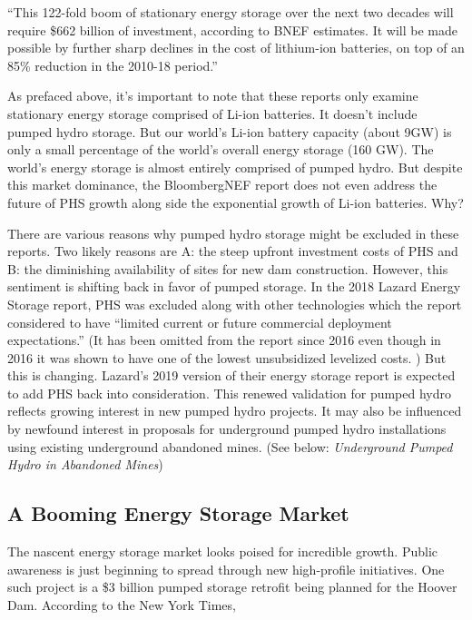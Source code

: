 \documentclass[hidelinks,12pt,a4paper]{article}
\begin{document}
\begin{displayquote}
“This 122-fold boom of stationary energy storage over the next two decades will require \$662 billion of investment, according to BNEF estimates. It will be made possible by further sharp declines in the cost of lithium-ion batteries, on top of an 85\% reduction in the 2010-18 period.” \cite{EnergyStorageInvestmentsBoom}
\end{displayquote}

As prefaced above, it's important to note that these reports only examine stationary energy storage comprised of Li-ion batteries. It doesn't include pumped hydro storage. But our world's Li-ion battery capacity (about 9GW) is only a small percentage of the world's overall energy storage (160 GW). \cite{ElectricityAndEnergyStorageWorldNuclearAssociation} The world's energy storage is almost entirely comprised of pumped hydro. But despite this market dominance, the BloombergNEF report does not even address the future of PHS growth along side the exponential growth of Li-ion batteries. Why?

There are various reasons why pumped hydro storage might be excluded in these reports. Two likely reasons are A: the steep upfront investment costs of PHS and B: the diminishing availability of sites for new dam construction. However, this sentiment is shifting back in favor of pumped storage. In the 2018 Lazard Energy Storage report, PHS was excluded along with other technologies which the report considered to have “limited current or future commercial deployment expectations.” \cite{LazardsLevelizedCostOfStorageAnalysis2018Version4} (It has been omitted from the report since 2016 even though in 2016 it was shown to have one of the lowest unsubsidized levelized costs. \cite{LazardsLevelizedCostOfStorageAnalysis2016Version2}) But this is changing. Lazard's 2019 version of their energy storage report is expected to add PHS back into consideration. \cite{PumpedEnergyStorageVitalToCalifornia} This renewed validation for pumped hydro reflects growing interest in new pumped hydro projects. It may also be influenced by newfound interest in proposals for underground pumped hydro installations using existing underground abandoned mines. (See below: \textit{Underground Pumped Hydro in Abandoned Mines})

\subsection{A Booming Energy Storage Market}
The nascent energy storage market looks poised for incredible growth. Public awareness is just beginning to spread through new high-profile initiatives. One such project is a \$3 billion pumped storage retrofit being planned for the Hoover Dam. According to the New York Times,
\end{document}
